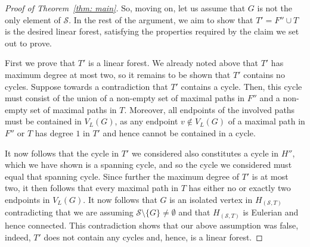 \documentclass[11pt,reqno]{article}
\newenvironment{claimproof}[1][\proofname]{\proof[#1]\renewcommand{\qedsymbol}{$\blacksquare$}}{\endproof}
\begin{document}
\begin{proof}[Proof of Theorem~\ref{thm: main}]
\begin{claimproof}
    So, moving on, let us assume that $G$ is not the only element of $\mathcal S$. In the rest of the argument, we aim to show that $T'=F''\cup T$ is the desired linear forest, satisfying the properties required by the claim we set out to prove. 

First we prove that $T'$ is a linear forest. We already noted above that $T'$ has maximum degree at most two, so it remains to be shown that $T'$ contains no cycles. Suppose towards a contradiction that $T'$ contains a cycle. Then, this cycle must consist of the union of a non-empty set of maximal paths in $F''$ and a non-empty set of maximal paths in $T$. Moreover, all endpoints of the involved paths must be contained in $V_L(G)$, as any endpoint $v\notin V_L(G)$ of a maximal path in $F''$ or $T$ has degree $1$ in $T'$ and hence cannot be contained in a cycle.

It now follows that the cycle in $T'$ we considered also constitutes a cycle in $H''$, which we have shown is a spanning cycle, and so the cycle we considered must equal that spanning cycle. Since further the maximum degree of $T'$ is at most two, it then follows that every maximal path in $T$ has either no or exactly two endpoints in $V_L(G)$. It now follows that $G$ is an isolated vertex in $H_{(\mathcal S,T)}$ contradicting that we are assuming $\mathcal S\setminus \{G\}\neq \emptyset$ and that $H_{(\mathcal S,T)}$ is Eulerian and hence connected. This contradiction shows that our above assumption was false, indeed, $T'$ does not contain any cycles and, hence, is a linear forest. 


\end{claimproof}
\end{proof}
\end{document}
